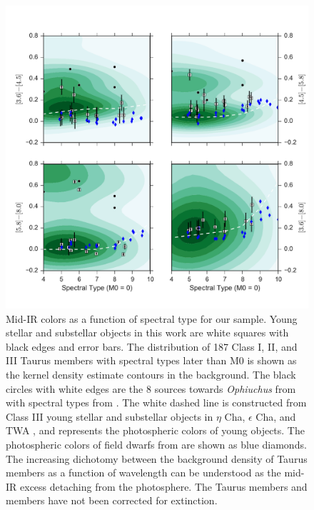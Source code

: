 \begin{figure}[ht!]
  \caption[Mid-IR colors as a function of spectral type for our sample]{Mid-IR colors as a function of spectral type for our sample.  Young stellar and substellar objects in this work are white squares with black edges and error bars.  The distribution of 187 Class I, II, and III Taurus members with spectral types later than M0 \citep{2010ApJS..186..111L} is shown as the kernel density estimate contours in the background.  The black circles with white edges are the 8 sources towards \emph{Ophiuchus} from \citet{allers06} with spectral types from \citet{2011ASPC..448..633G}.  The white dashed line is constructed from Class III young stellar and substellar objects in $\eta$ Cha, $\epsilon$ Cha, and TWA \citep{2010ApJS..186..111L}, and represents the photospheric colors of young objects.  The photospheric colors of field dwarfs from \citet{2006ApJ...651..502P} are shown as blue diamonds. 
  The increasing dichotomy between the background density of Taurus members as a function of wavelength can be understood as the mid-IR excess detaching from the photosphere.  The Taurus members and \citet{allers06} members have not been corrected for extinction.  \label{fig_midIR_results} }
\centering
\includegraphics[scale=0.6]{chIMACS/figures/midIR_phot_results.pdf}
\end{figure}

